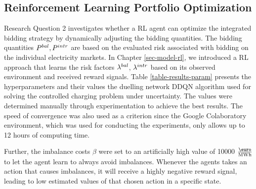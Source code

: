\documentclass[a4paper, 12pt]{article}
\begin{document}
\subsection{Reinforcement Learning Portfolio Optimization}
\label{sec:org74ec928}
Research Question 2 investigates whether a RL agent can optimize the integrated
bidding strategy by dynamically adjusting the bidding quantities. The bidding
quantities \(P^{bal}_{}, P^{intr}_{}\) are based on the evaluated risk associated with
bidding on the individual electricity markets. In Chapter \ref{sec-model-rl}, we
introduced a RL approach that learns the risk factors \(\lambda^{bal}_{}\), \(\lambda^{intr}_{}\) based on
its observed environment and received reward signals. Table
\ref{table-results-param} presents the hyperparameters and their values the
duelling network DDQN algorithm used for solving the controlled charging problem
under uncertainty. The values were determined manually through experimentation
to achieve the best results. The speed of convergence was also used as a
criterion since the Google Colaboratory environment, which was used for
conducting the experiments, only allows up to 12 hours of computing time.

Further, the imbalance costs \(\beta\) were set to an artificially high value of
10000 \(\emwh\) to let the agent learn to always avoid imbalances. Whenever the
agents takes an action that causes imbalances, it will receive a highly negative
reward signal, leading to low estimated values of that chosen action in a
specific state.
\end{document}
